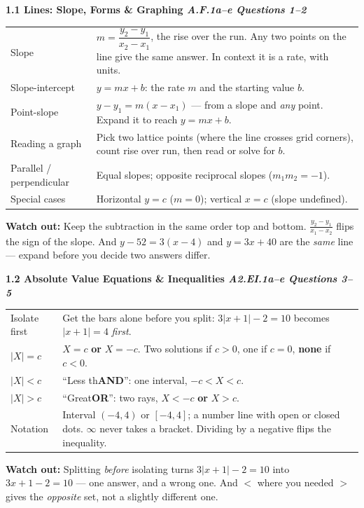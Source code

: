 \documentclass[10pt]{article}
\newcommand{\sghead}[2]{%
  \boxguard[10]%
  \vspace{4pt}\par\noindent
  \colorbox{forest}{\parbox{\dimexpr\linewidth-2\fboxsep}{%
    \small\color{white}\bfseries #1 \hfill \textmd{\itshape\scriptsize\color{forestmid} #2}}}%
  \vspace{2pt}\par}
\newcommand{\sgwatch}[1]{%
  \vspace{1pt}\par\noindent
  \colorbox{redbg}{\parbox{\dimexpr\linewidth-2\fboxsep}{%
    \footnotesize\textbf{\textcolor{redacc}{Watch out:}} #1}}%
  \vspace{1pt}\par}
\newcommand{\sgtabsetup}{\renewcommand{\arraystretch}{1.06}\footnotesize}
\begin{document}
\sghead{1.1 \quad Lines: Slope, Forms \& Graphing}{A.F.1a--e \;\textbullet\; Questions 1--2}
{\sgtabsetup
\begin{tabularx}{\linewidth}{@{} G X @{}}
Slope & $m=\dfrac{y_2-y_1}{x_2-x_1}$, the rise over the run. Any two points on the line give the
  same answer. In context it is a rate, with units. \\
Slope-intercept & $y=mx+b$: the rate $m$ and the starting value $b$. \\
Point-slope & $y-y_1=m(x-x_1)$ --- from a slope and \emph{any} point. Expand it to reach
  $y=mx+b$. \\
Reading a graph & Pick two lattice points (where the line crosses grid corners), count rise over
  run, then read or solve for $b$. \\
Parallel / perpendicular & Equal slopes; opposite reciprocal slopes ($m_1m_2=-1$). \\
Special cases & Horizontal $y=c$ ($m=0$); vertical $x=c$ (slope undefined). \\
\end{tabularx}}
\sgwatch{Keep the subtraction in the same order top and bottom. $\frac{y_2-y_1}{x_1-x_2}$ flips
the sign of the slope. And $y-52=3(x-4)$ and $y=3x+40$ are the \emph{same} line --- expand
before you decide two answers differ.}

\sghead{1.2 \quad Absolute Value Equations \& Inequalities}{A2.EI.1a--e \;\textbullet\; Questions 3--5}
{\sgtabsetup
\begin{tabularx}{\linewidth}{@{} G X @{}}
Isolate first & Get the bars alone before you split: $3|x+1|-2=10$ becomes $|x+1|=4$
  \emph{first}. \\
$|X|=c$ & $X=c$ \textbf{or} $X=-c$. Two solutions if $c>0$, one if $c=0$, \textbf{none} if
  $c<0$. \\
$|X|<c$ & ``Less th\textbf{AND}'': one interval, $-c<X<c$. \\
$|X|>c$ & ``Great\textbf{OR}'': two rays, $X<-c$ \textbf{or} $X>c$. \\
Notation & Interval $(-4,4)$ or $[-4,4]$; a number line with open or closed dots. $\infty$
  never takes a bracket. Dividing by a negative flips the inequality. \\
\end{tabularx}}
\sgwatch{Splitting \emph{before} isolating turns $3|x+1|-2=10$ into $3x+1-2=10$ --- one answer,
and a wrong one. And $<$ where you needed $>$ gives the \emph{opposite} set, not a slightly
different one.}
\end{document}
